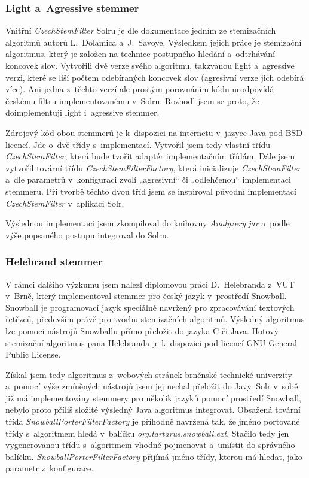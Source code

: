 \subsubsection{Light a~Agressive stemmer}
Vnitřní \emph{CzechStemFilter} Solru je dle dokumentace\cite{sorl:doc} jedním ze stemizačních algoritmů autorů L.~Dolamica a~J.~Savoye. Výsledkem jejich práce \cite{Dolamic:2009:Stemming} je stemizační algoritmus, který je založen na technice postupného hledání a~odtrhávání koncovek slov. Vytvořili dvě verze svého algoritmu, takzvanou light a~agressive verzi, které se liší počtem odebíraných koncovek slov (agresivní verze jich odebírá více). Ani jedna z~těchto verzí ale prostým porovnáním kódu neodpovídá českému filtru implementovanému v~Solru. Rozhodl jsem se proto, že doimplementuji light i~agressive stemmer.

Zdrojový kód obou stemmerů je k~dispozici na internetu v~jazyce Java pod BSD licencí. Jde o~dvě třídy s~implementací. Vytvořil jsem tedy vlastní třídu \emph{CzechStemFilter}, která bude tvořit adaptér implementačním třídám. Dále jsem vytvořil tovární třídu \emph{CzechStemFilterFactory}, která inicializuje \emph{CzechStemFilter} a~dle parametrů v~konfiguraci zvolí „agresivní“ či „odlehčenou“ implementaci stemmeru. Při tvorbě těchto dvou tříd jsem se inspiroval původní implementací \emph{CzechStemFilter} v~aplikaci Solr.

Výslednou implementaci jsem zkompiloval do knihovny \emph{Analyzery.jar} a~podle výše popsaného postupu integroval do Solru.

\subsubsection{Helebrand stemmer}
V rámci dalšího výzkumu jsem nalezl diplomovou práci D.~Helebranda z~VUT v~Brně\cite{Helebrand:2010:Stemming}, který implementoval stemmer pro český jazyk v~prostředí Snowball. Snowball je programovací jazyk speciálně navržený pro zpracovávání textových řetězců, především právě pro tvorbu stemizačních algoritmů. Výsledný algoritmus lze pomocí nástrojů Snowballu přímo přeložit do jazyka C či Java. Hotový stemizační algoritmus pana Helebranda je k~dispozici pod licencí GNU General Public License.

Získal jsem tedy algoritmus z~webových stránek brněnské technické univerzity a~pomocí výše zmíněných nástrojů jsem jej nechal přeložit do Javy. Solr v~sobě již má implementovány stemmery pro několik jazyků pomocí prostředí Snowball, nebylo proto příliš složité výsledný Java algoritmus integrovat. Obsažená tovární třída \emph{SnowballPorterFilterFactory} je příhodně navržená tak, že jméno  portované třídy s~algoritmem hledá v~balíčku \emph{org.tartarus.snowball.ext}. Stačilo tedy jen vygenerovanou třídu s~algoritmem vhodně pojmenovat a~umístit do správného balíčku. \emph{SnowballPorterFilterFactory} přijímá jméno třídy, kterou má hledat, jako parametr z~konfigurace.

